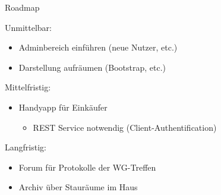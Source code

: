\begin{frame}{Roadmap}

Unmittelbar:
\begin{itemize}
\item Adminbereich einführen (neue Nutzer, etc.)
\item Darstellung aufräumen (Bootstrap, etc.)
\end{itemize}

Mittelfristig:
\begin{itemize}
\item Handyapp für Einkäufer
\begin{itemize}
\item REST Service notwendig (Client-Authentification)
\end{itemize}
\end{itemize}

Langfristig:
\begin{itemize}
\item Forum für Protokolle der WG-Treffen
\item Archiv über Stauräume im Haus
\end{itemize}

\end{frame}
